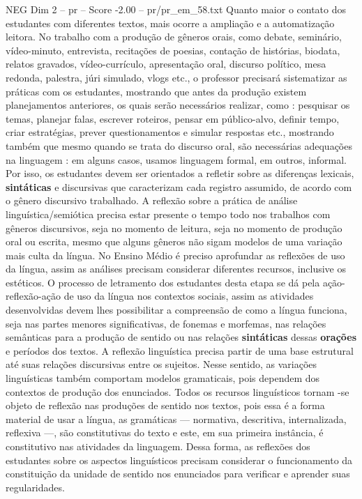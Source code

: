 \begin{textsample}{NEG Dim 2 – pr – Score -2.00 – pr/pr\_em\_58.txt}
Quanto maior o contato dos estudantes com diferentes textos, mais ocorre a ampliação e a automatização leitora.
No trabalho com a produção de gêneros orais, como debate, seminário, vídeo-minuto, entrevista, recitações de poesias, contação de histórias, biodata, relatos gravados, vídeo-currículo, apresentação oral, discurso político, mesa redonda, palestra, júri simulado, vlogs etc., o professor precisará sistematizar as práticas com os estudantes, mostrando que antes da produção existem planejamentos anteriores, os quais serão necessários realizar, como : pesquisar os temas, planejar falas, escrever roteiros, pensar em público-alvo, definir tempo, criar estratégias, prever questionamentos e simular respostas etc., mostrando também que mesmo quando se trata do discurso oral, são necessárias adequações na linguagem : em alguns casos, usamos linguagem formal, em outros, informal.
Por isso, os estudantes devem ser orientados a refletir sobre as diferenças lexicais, \textbf{sintáticas} e discursivas que caracterizam cada registro assumido, de acordo com o gênero discursivo trabalhado.
A reflexão sobre a prática de análise linguística/semiótica precisa estar presente o tempo todo nos trabalhos com gêneros discursivos, seja no momento de leitura, seja no momento de produção oral ou escrita, mesmo que alguns gêneros não sigam modelos de uma variação mais culta da língua.
No Ensino Médio é preciso aprofundar as reflexões de uso da língua, assim as análises precisam considerar diferentes recursos, inclusive os estéticos.
O processo de letramento dos estudantes desta etapa se dá pela ação-reflexão-ação de uso da língua nos contextos sociais, assim as atividades desenvolvidas devem lhes possibilitar a compreensão de como a língua funciona, seja nas partes menores significativas, de fonemas e morfemas, nas relações semânticas para a produção de sentido ou nas relações \textbf{sintáticas} dessas \textbf{orações} e períodos dos textos.
A reflexão linguística precisa partir de uma base estrutural até suas relações discursivas entre os sujeitos.
Nesse sentido, as variações linguísticas também comportam modelos gramaticais, pois dependem dos contextos de produção dos enunciados.
Todos os recursos linguísticos tornam -se objeto de reflexão nas produções de sentido nos textos, pois essa é a forma material de usar a língua, as gramáticas — normativa, descritiva, internalizada, reflexiva —, são constitutivas do texto e este, em sua primeira instância, é constitutivo nas atividades da linguagem.
Dessa forma, as reflexões dos estudantes sobre os aspectos linguísticos precisam considerar o funcionamento da constituição da unidade de sentido nos enunciados para verificar e aprender suas regularidades.

\end{textsample}
